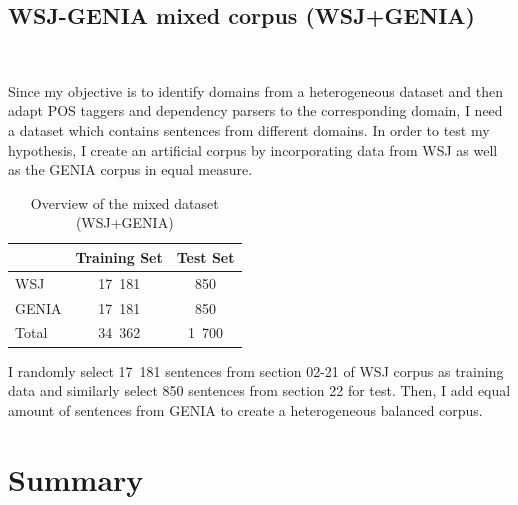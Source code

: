 \subsection{WSJ-GENIA mixed corpus (WSJ+GENIA)} ~\label{sec:wsjgeniamixedcorpus}

Since my objective is to identify domains from a heterogeneous dataset and then adapt POS taggers and dependency parsers to the corresponding domain, I need a dataset which contains sentences from different domains. In order to test my hypothesis, I create an artificial corpus by incorporating data from WSJ as well as the GENIA corpus in equal measure. 

\begin{table}[t]
\centering
\begin{tabular}{l|c|c}
      & Training Set & Test Set   \\ \hline
WSJ   & 17~181  & 850        \\
GENIA & 17~181  & 850        \\ \hline
Total & 34~362  & 1~700 \\ \hline
\end{tabular}
\caption{Overview of the mixed dataset (WSJ+GENIA)}
\label{tab:mixeddata}
\end{table}

I randomly select 17~181 sentences from section 02-21 of WSJ corpus as training data and similarly select 850 sentences from section 22 for test. Then, I add equal amount of sentences from GENIA to create a heterogeneous balanced corpus. 



\section{Summary}

